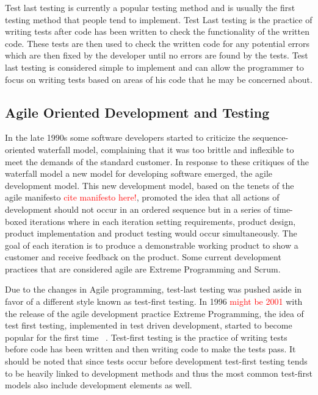 \documentclass{sig-alternate}
\newcommand{\mycomment}[1]{\textcolor{red}{#1}}
\begin{document}
Test last testing is currently a popular testing method and is usually the first testing method that people tend to implement.  Test Last testing is the practice of writing tests after code has been written to check the functionality of the written code.  These tests are then used to check the written code for any potential errors which are then fixed by the developer until no errors are found by the tests.  Test last testing is considered simple to implement and can allow the programmer to focus on writing tests based on areas of his code that he may be concerned about.

\subsection{Agile Oriented Development and Testing}

In the late 1990s some software developers started to criticize the sequence-oriented waterfall model, complaining that it was too brittle and inflexible to meet the demands of the standard customer.  In response to these critiques of the waterfall model a new model for developing software emerged, the agile development model.  This new development model, based on the tenets of the agile manifesto \mycomment{cite manifesto here!}, promoted the idea that all actions of development should not occur in an ordered sequence but in a series of time-boxed iterations where in each iteration setting requirements, product design, product implementation and product testing would occur simultaneously.  The goal of each iteration is to produce a demonstrable working product to show a customer and receive feedback on the product.  Some current development practices that are considered agile are Extreme Programming and Scrum.

Due to the changes in Agile programming, test-last testing was pushed aside in favor of a different style known as test-first testing.  In 1996 \mycomment{might be 2001} with the release of the agile development practice Extreme Programming, the idea of test first testing, implemented in test driven development, started to become popular for the first time ~\cite{Hammond:2012}. Test-first testing is the practice of writing tests before code has been written and then writing code to make the tests pass.  It should be noted that since tests occur before development test-first testing tends to be heavily linked to development methods and thus the most common test-first models also include development elements as well. 
\end{document}
